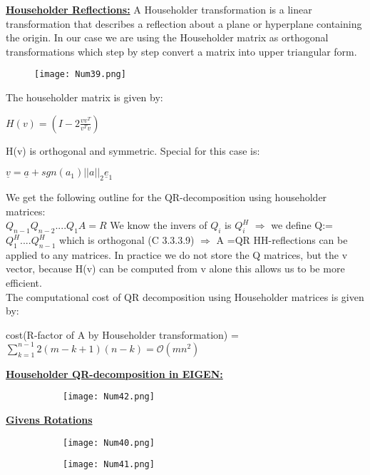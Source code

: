 \documentclass[8pt]{extreport}
\begin{document}
\underline{\textbf{Householder Reflections:}} A Householder transformation is a linear transformation that describes a reflection about a plane or hyperplane containing the origin. In our case we are using the Householder matrix as orthogonal transformations which step by step convert a matrix into upper triangular form.
\begin{figure}[H]
\centering
\texttt{[image: Num39.png]}
\end{figure}
The householder matrix is given by:
\begin{center}
$H(v) = (I- 2\frac{vv^T}{v^Tv})$
\end{center}
H(v) is orthogonal and symmetric. Special for this case is:
\begin{center}
$\underline{v} = \underline{a} + sgn(a_1)||a||_2\underline{e}_1$ 
\end{center}
We get the following outline for the QR-decomposition using householder matrices:\\
$Q_{n-1}Q_{n-2}....Q_1A = R$ We know the invers of $Q_i$ is $Q_i^H$ 
$\Rightarrow$ we define Q:=$Q_1^H....Q_{n-1}^H$ which is orthogonal (C 3.3.3.9)
$\Rightarrow$ A =QR
HH-reflections can be applied to any matrices. In practice we do not store the Q matrices, but the v vector, because H(v) can be computed from v alone this allows us to be more efficient.\\
The computational cost of QR decomposition using Householder matrices is given by:
\begin{center}
cost(R-factor of A by Householder transformation) = $\displaystyle\sum_{k=1}^{n-1}2(m-k+1)(n-k) = \mathcal{O}(mn^2)$
\end{center}
\underline{\textbf{Householder QR-decomposition in EIGEN:}}
\begin{figure}[H]
\centering
\begin{subfigure}[b]{0.32\linewidth}
\texttt{[image: Num42.png]}
\end{subfigure}
\end{figure}
\underline{\textbf{Givens Rotations}}
\begin{figure}[H]
\centering
\begin{subfigure}[b]{0.32\linewidth}
\texttt{[image: Num40.png]}
\end{subfigure}
\begin{subfigure}[b]{0.32\linewidth}
\texttt{[image: Num41.png]}
\end{subfigure}
\end{figure}
\end{document}
